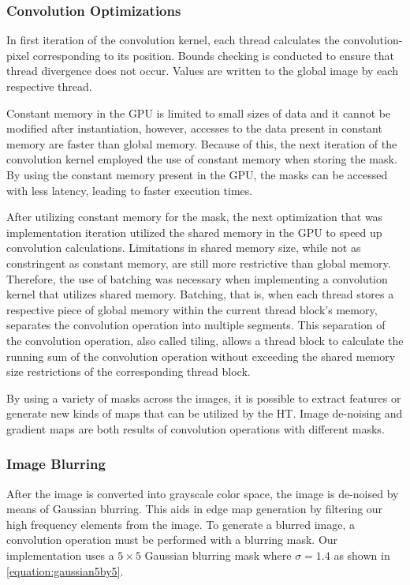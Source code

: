 \documentclass[conference]{IEEEtran}
\begin{document}
\subsubsection*{Convolution Optimizations}
In first iteration of the convolution kernel, each thread calculates the convolution-pixel corresponding to its position. 
Bounds checking is conducted to ensure that thread divergence does not occur. 
Values are written to the global image by each respective thread.

Constant memory in the GPU is limited to small sizes of data and it cannot be modified after instantiation, however, accesses to the data present in constant memory are faster than global memory.
Because of this, the next iteration of the convolution kernel employed the use of constant memory when storing the mask. 
By using the constant memory present in the GPU, the masks can be accessed with less latency, leading to faster execution times.


After utilizing constant memory for the mask, the next optimization that was implementation iteration utilized the shared memory in the GPU to speed up convolution calculations.
Limitations in shared memory size, while not as constringent as constant memory, are still more restrictive than global memory.
Therefore, the use of batching was necessary when implementing a convolution kernel that utilizes shared memory. 
Batching, that is, when each thread stores a respective piece of global memory within the current thread block's memory, separates the convolution operation into multiple segments.
This separation of the convolution operation, also called tiling, allows a thread block to calculate the running sum of the convolution operation without exceeding the shared memory size restrictions of the corresponding thread block.















By using a variety of masks across the images, it is possible to extract features or generate new kinds of maps that can be utilized by the HT\@.
Image de-noising and gradient maps are both results of convolution operations with different masks.

\subsubsection{Image Blurring}
After the image is converted into grayscale color space, the image is de-noised by means of Gaussian blurring.
This aids in edge map generation by filtering our high frequency elements from the image.
To generate a blurred image, a convolution operation must be performed with a blurring mask. 
Our implementation uses a $5 \times 5$ Gaussian blurring mask where $\sigma = 1.4$ as shown in \autoref{equation:gaussian5by5}.
\end{document}
